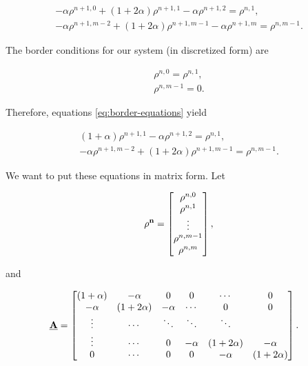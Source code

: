 \begin{align}
    -\alpha \rho^{n+1,0} + ( 1 + 2\alpha ) \rho^{n+1,1} -\alpha \rho^{n+1,2} = \rho^{n,1},\\
    -\alpha \rho^{n+1,m-2} + ( 1 + 2\alpha ) \rho^{n+1,m-1} -\alpha \rho^{n+1,m} = \rho^{n,m-1}.
    \label{eq:border-equations}
\end{align}

The border conditions for our system (in discretized form) are

\begin{align}
    \rho^{n, 0} = \rho^{n, 1}, \\
    \rho^{n, m-1} = 0.
\end{align}

Therefore, equations \ref{eq:border-equations} yield

\begin{align}
    ( 1 + \alpha ) \rho^{n+1,1} -\alpha \rho^{n+1,2} = \rho^{n,1},\\
    -\alpha \rho^{n+1,m-2} + ( 1 + 2\alpha ) \rho^{n+1,m-1} = \rho^{n,m-1}.
\end{align}

We want to put these equations in matrix form. Let 

\begin{align}
    \bf{\rho^n} = \begin{bmatrix}
                    \rho^{n, 0} \\
                    \rho^{n, 1} \\
                    \vdots \\
                    \rho^{n, m-1} \\
                    \rho^{n, m} \\
                    \end{bmatrix},
\end{align}

and 

\begin{align}
\bf{\underline{A}} &= \begin{bmatrix}
           ( 1 + \alpha ) & -\alpha  &  0 & 0 &  \cdots & 0\\
             -\alpha & ( 1 + 2 \alpha ) & -\alpha & \cdots & 0 & 0\\
           \vdots  &\cdots  & \ddots & \ddots &  \ddots&  \\
            \vdots & \cdots & 0  &  -\alpha & ( 1 + 2 \alpha ) & -\alpha \\
            0 & \cdots &0  & 0 & -\alpha & ( 1 + 2 \alpha )
         \end{bmatrix}
         \label{eq:discretization-matrix}.
\end{align}

